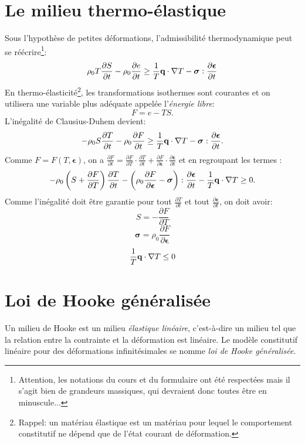 \section{Le milieu thermo-élastique}
Sous l'hypothèse de petites déformations, l'admissibilité thermodynamique peut se réécrire\footnote{Attention, les notations du cours et du formulaire ont été respectées mais il s'agit bien de grandeurs massiques, qui devraient donc toutes être en minuscule...}:
$$\rho_0T\frac{\partial S}{\partial t}-\rho_0\frac{\partial e}{\partial t}\geq\frac{1}{T}\textbf{q}\cdot\nabla T-\boldsymbol{\sigma}:\frac{\partial \boldsymbol{\epsilon}}{\partial t}$$
En thermo-élasticité\footnote{Rappel: un matériau élastique est un matériau pour lequel le comportement constitutif ne dépend que de l'état courant de déformation.}, les transformations isothermes sont courantes et on utilisera une variable plus adéquate appelée l'\emph{énergie libre}:
$$F=e-TS.$$
L'inégalité de Clausius-Duhem devient: $$-\rho_0S\frac{\partial T}{\partial t}-\rho_0\frac{\partial F}{\partial t}\geq\frac{1}{T}\textbf{q}\cdot\nabla T-\boldsymbol{\sigma}:\frac{\partial \boldsymbol{\epsilon}}{\partial t}.$$
Comme $F=F(T,\boldsymbol{\epsilon})$, on a $\frac{\partial F}{\partial t} =\frac{\partial F}{\partial T}\cdot\frac{\partial T}{\partial t}+\frac{\partial F}{\partial\boldsymbol{\epsilon}}\cdot\frac{\partial\boldsymbol{\epsilon}}{\partial t}$ et en regroupant les termes :
$$-\rho_0\left(S+\frac{\partial F}{\partial T}\right)\frac{\partial T}{\partial t}-\left(\rho_0\frac{\partial F}{\partial\boldsymbol{\epsilon}}-\boldsymbol{\sigma}\right):\frac{\partial \boldsymbol{\epsilon}}{\partial t}-\frac{1}{T}\textbf{q}\cdot\nabla T\geq 0.$$
Comme l'inégalité doit être garantie pour tout $\frac{\partial T}{\partial t}$ et tout $\frac{\partial\boldsymbol{\epsilon}}{\partial t}$, on doit avoir:
$$\boxed{S=-\frac{\partial F}{\partial T}}$$
$$\boxed{\boldsymbol{\sigma}=\rho_0\frac{\partial F}{\partial \boldsymbol{\epsilon}}}$$
$$\frac{1}{T}\textbf{q}\cdot\nabla T\leq 0$$

\section{Loi de Hooke généralisée}
Un milieu de Hooke est un milieu \emph{élastique linéaire}, c'est-à-dire un milieu tel que la relation entre la contrainte et la déformation est linéaire. Le modèle constitutif linéaire pour des déformations infinitésimales se nomme \emph{loi de Hooke généralisée}.
